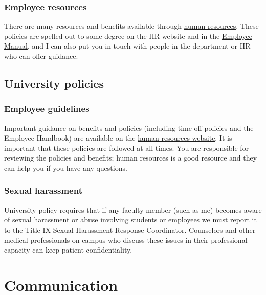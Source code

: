 \documentclass[letterpaper,11pt,oneside]{memoir}
\begin{document}
\subsection{Employee resources}

There are many resources and benefits available through \href{https://www.temple.edu/faculty-and-staff/working-temple/human-resources}{human resources}. These policies are spelled out to some degree on the HR website and in the \href{http://www.temple.edu/hr/departments/employeerelations/documents/Employee_Manual_Feb_2016.pdf}{Employee Manual}, and I can also put you in touch with people in the department or HR who can offer guidance.



\section{University policies}

\subsection{Employee guidelines}
Important guidance on benefits and policies (including time off policies and the Employee Handbook) are available on the \href{https://www.temple.edu/faculty-and-staff/working-temple/human-resources}{human resources website}. It is important that these policies are followed at all times. You are responsible for reviewing the policies and benefits; human resources is a good resource and they can help you if you have any questions.

\subsection{Sexual harassment}
University policy requires that if any faculty member (such as me) becomes aware of sexual harassment or abuse involving students or employees we must report it to the Title IX Sexual Harassment Response Coordinator. Counselors and other medical professionals on campus who discuss these issues in their professional capacity can keep patient confidentiality.



\chapter{Communication}
\end{document}
